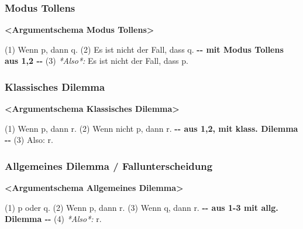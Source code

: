 \documentclass[
  english,
  a4paper,
]{article}
\newenvironment{Shaded}{\begin{snugshade}}{\end{snugshade}}
\newcommand{\AlertTok}[1]{\textcolor[rgb]{0.02,0.51,0.79}{\textbf{#1}}}
\newcommand{\ErrorTok}[1]{\textcolor[rgb]{0.02,0.51,0.79}{#1}}
\newcommand{\FloatTok}[1]{\textcolor[rgb]{0.12,0.11,0.11}{\textit{#1}}}
\newcommand{\NormalTok}[1]{\textcolor[rgb]{0.12,0.11,0.11}{#1}}
\newcommand{\WarningTok}[1]{\textcolor[rgb]{0.46,0.73,0.89}{\textbf{#1}}}
\renewenvironment{Shaded}{\centering \begin{mdframed}[style=codedefault]}{\end{mdframed}}%
\newenvironment{Shaded}{\centering \begin{mdframed}[style=codedefault]}{\end{mdframed}}%
\begin{document}
\subsubsection{Modus Tollens}\label{modus-tollens}

\begin{Shaded}
\begin{Highlighting}[]
\AlertTok{\textless{}Argumentschema Modus Tollens\textgreater{}}

\ErrorTok{(1)}\NormalTok{ Wenn p, dann q.}
\ErrorTok{(2)}\NormalTok{ Es ist nicht der Fall, dass q.}
\WarningTok{{-}{-} mit Modus Tollens aus 1,2 {-}{-}}
\ErrorTok{(3)}\FloatTok{ *Also*:}\NormalTok{ Es ist nicht der Fall, dass p.}
\end{Highlighting}
\end{Shaded}

\subsubsection{Klassisches Dilemma}\label{klassisches-dilemma}

\begin{Shaded}
\begin{Highlighting}[]
\AlertTok{\textless{}Argumentschema Klassisches Dilemma\textgreater{}}

\ErrorTok{(1)}\NormalTok{ Wenn p, dann r.}
\ErrorTok{(2)}\NormalTok{ Wenn nicht p, dann r.}
\WarningTok{{-}{-} aus 1,2, mit klass. Dilemma {-}{-}}
\ErrorTok{(3)}\NormalTok{ Also: r.}
\end{Highlighting}
\end{Shaded}

\subsubsection{Allgemeines Dilemma /
Fallunterscheidung}\label{allgemeines-dilemma-fallunterscheidung}

\begin{Shaded}
\begin{Highlighting}[]
\AlertTok{\textless{}Argumentschema Allgemeines Dilemma\textgreater{}}

\ErrorTok{(1)}\NormalTok{ p oder q.}
\ErrorTok{(2)}\NormalTok{ Wenn p, dann r.}
\ErrorTok{(3)}\NormalTok{ Wenn q, dann r.}
\WarningTok{{-}{-} aus 1{-}3 mit allg. Dilemma {-}{-}}
\ErrorTok{(4)}\FloatTok{ *Also*:}\NormalTok{ r.}
\end{Highlighting}
\end{Shaded}
\end{document}
